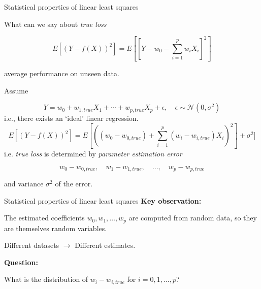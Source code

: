 \documentclass{beamer}
\begin{document}
\begin{frame}{Statistical properties of linear least squares}

 What can we say about \emph{true loss}
 
 \[ E[(Y-f(X))^2]=E[[Y-w_0-\sum_{i=1}^p w_i X_i]^2] \]

 average performance on unseen data. 

 \bigskip

Assume

\[ Y=w_0+ w_{1,true}X_1+\cdots + w_{p,true} X_p + \epsilon, \quad \epsilon \sim \mathcal{N}(0, \sigma^2) 
\]
i.e., there exists an `ideal' linear regression.
\[ 
  E[(Y-f(X))^2]=E[\left((w_0-w_{0,true}) + \sum_{i=1}^p (w_i-w_{i,true}) X_i\right)^2]  + \sigma^2] 
\]
i.e. \emph{true loss} is determined by \emph{parameter estimation error}

\[ w_0-w_{0,true}, \quad w_1-w_{1,true}, \quad \ldots, \quad w_p-w_{p,true} \]

and variance $\sigma^2$ of the error. 

\end{frame}
\begin{frame}{Statistical properties of linear least squares}
\textbf{Key observation:}

The estimated coefficients $w_0, w_1, \ldots, w_p$ are computed from random data, so they are themselves random variables.

\vspace{0.3cm}

Different datasets $\rightarrow$ Different estimates.

\vspace{0.5cm}

\textbf{Question:}

What is the distribution of $w_i - w_{i,true}$ for $i = 0, 1, \ldots, p$?

\end{frame}
\end{document}

